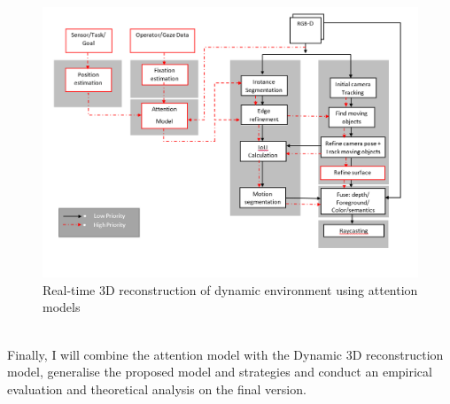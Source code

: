 \begin{figure}[h]
    \centering
    \includegraphics[scale=0.55]{images/Dyn_Reco_Attention.PNG}
    \caption{Real-time 3D reconstruction of dynamic environment using attention models}
    \label{fig:Attention}
\end{figure}\\



Finally, I will combine the attention model with the Dynamic 3D reconstruction model, generalise the proposed model and strategies and conduct an empirical evaluation and theoretical analysis on the final version.

